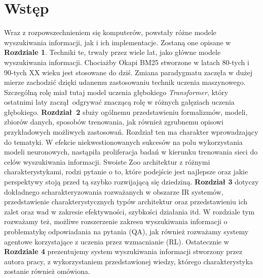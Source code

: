 \chapter*{Wstęp}
\label{chap:wstep}

Wraz z rozpowszechnieniem się komputerów, powstały różne modele wyszukiwania informacji, jak i ich implementacje. Zostaną one opisane w \textbf{Rozdziale 1}. Techniki te, trwały przez wiele lat, jako główne modele wyszukiwania informacji. Chociażby Okapi BM25 stworzone w latach 80-tych i 90-tych XX wieku jest stosowane do dziś. Zmiana paradygmatu zaczęła w dużej mierze zachodzić dzięki udanemu zastosowaniu technik uczenia maszynowego. Szczególną rolę miał tutaj model uczenia głębokiego \textit{Transformer}, który ostatnimi laty zaczął odgrywać znaczącą rolę w różnych gałęziach uczenia głębokiego. \textbf{Rozdział 2} służy ogólnemu przedstawieniu formalizmów, modeli, zbiorów danych, sposobów trenowania, jak również zgrubnemu opisowi przykładowych możliwych zastosowań. Rozdział ten ma charakter wprowadzający do tematyki. W efekcie niekwestionowanych sukcesów na polu wykorzystania modeli neuronowych, nastąpiła proliferacja badań w kierunku trenowania sieci do celów wyszukiwania informacji. Swoiste Zoo architektur z różnymi charakterystykami, rodzi pytanie o to, które podejście jest najlepsze oraz jakie perspektywy stoją przed tą szybko rozwijającą się dziedziną. \textbf{Rozdział 3} dotyczy dokładnego scharakteryzowania rozważanych w obszarze IR systemów, przedstawienie charakterystycznych typów architektur oraz przedstawieniu ich zalet oraz wad w zakresie efektywności, szybkości działania itd. W rozdziale tym rozważamy też, możliwe rozszerzenie zakresu wyszukiwania informacji o problematykę odpowiadania na pytania (QA), jak również rozważamy systemy agentowe korzystające z uczenia przez wzmacnianie (RL). Ostatecznie w \textbf{Rozdziale 4} prezentujemy system wyszukiwania informacji stworzony przez autora pracy, z wykorzystaniem przedstawionej  wiedzy, którego charakterystyka zostanie również omówiona.